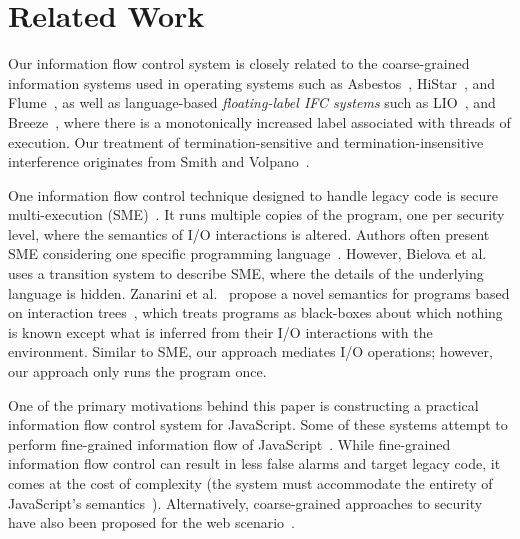 \section{Related Work}
\label{sec:related}




Our information flow control system is closely related
to the coarse-grained information systems used in operating systems such
as Asbestos~\cite{efstathopoulos:asbestos},
HiStar~\cite{Zeldovich:2006}, and Flume~\cite{krohn:flume}, as well as language-based
\emph{floating-label IFC systems} such as LIO~\cite{lio},
and Breeze~\cite{Hritcu:2013:YIB:2497621.2498098}, where there is a
monotonically increased label
associated with threads of execution.
Our treatment of termination-sensitive and termination-insensitive interference
originates from Smith and Volpano~\cite{Smith:Volpano:MultiThreaded,Volpano:1997:ECF:794197.795081}.

One information flow control technique designed to handle legacy code is
secure multi-execution (SME)~\cite{Devriese:2010}. It runs
multiple copies of the program, one per security level, where the semantics of
I/O interactions is altered. Authors often present
SME considering one specific programming
language~\cite{KULeuven-350547,Rafnson:2013}. However, Bielova et
al.~\cite{Biel-etal-11-TR} uses a transition system to describe SME, where the
details of the underlying language is hidden.  Zanarini et
al.~\cite{ZanariniJR13} propose a novel semantics for programs based on
interaction trees~\cite{jacobs-tutorial}, which treats programs as black-boxes
about which nothing is known except what is inferred from their I/O interactions
with the environment. Similar to SME, our approach mediates I/O
operations; however, our approach only runs the program once.


One of the primary motivations behind this paper is constructing a practical
information flow control system for JavaScript.  Some of these systems attempt
to perform fine-grained information flow of
JavaScript~\cite{Hedin:2012,ConDOM,JSFlow}. While fine-grained information flow
control can result in less false alarms and target legacy code, it comes at the
cost of complexity (the system must accommodate the entirety of JavaScript's
semantics~\cite{JSFlow}).
Alternatively, coarse-grained
approaches to security have also been proposed for the web
scenario~\cite{Yip:2009:PBS,DeGroef:2012,conf/esorics/AkhaweLHSS13}.


